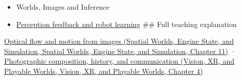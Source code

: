 \begin{itemize}
\item
  {Worlds, Images and Inference}
\item
  \hyperref[appendix-b0c42da325f1]{Perception feedback and robot learning} \#\# Full teaching explanation
\end{itemize}

\href{../05-Spatial-Worlds-Engine-State-and-Simulation/main.pdf\#nameddest=04-visual-computing-ii-ch030-optical-flow-and-motion-from-images}{Optical flow and motion from images (Spatial Worlds, Engine State, and Simulation, Spatial Worlds, Engine State, and Simulation, Chapter 11)} · \href{../07-Vision-XR-and-Playable-Worlds/main.pdf\#nameddest=04-visual-computing-ii-ch034-photographic-composition-history-and-communication}{Photographic composition, history, and communication (Vision, XR, and Playable Worlds, Vision, XR, and Playable Worlds, Chapter 4)}
